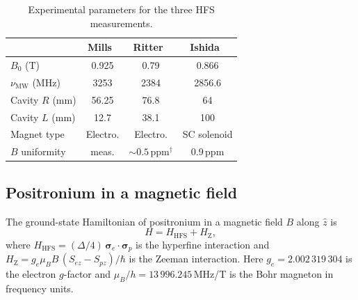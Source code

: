 \documentclass[twocolumn,pra,aps,superscriptaddress,floatfix,10pt]{revtex4-2}
\begin{document}
\begin{table}[b]
\caption{Experimental parameters for the three HFS measurements.}
\label{tab:experiments}
\begin{ruledtabular}
\begin{tabular}{lccc}
 & Mills~\cite{Mills1975} & Ritter~\cite{Ritter1984} & Ishida~\cite{Ishida2014} \\
\hline
$B_0$ (T) & 0.925 & 0.79 & 0.866 \\
$\nu_\mathrm{MW}$ (MHz) & 3253 & 2384 & 2856.6 \\
Cavity $R$ (mm) & 56.25 & 76.8 & 64 \\
Cavity $L$ (mm) & 12.7 & 38.1 & 100 \\
Magnet type & Electro. & Electro. & SC solenoid \\
$B$ uniformity & meas. & $\sim 0.5$\,ppm$^\dagger$ & 0.9\,ppm \\
\end{tabular}
\end{ruledtabular}
\end{table}

\subsection{Positronium in a magnetic field}
\label{sec:hamiltonian}

The ground-state Hamiltonian of positronium in a magnetic field $B$ along $\hat{z}$ is
\begin{equation}
  H = H_\mathrm{HFS} + H_\mathrm{Z},
  \label{eq:hamiltonian}
\end{equation}
where $H_\mathrm{HFS} = (\Delta/4)\,\bm{\sigma}_e \cdot \bm{\sigma}_p$ is the hyperfine interaction and $H_\mathrm{Z} = g_e \mu_B B \,(S_{ez} - S_{pz})/\hbar$ is the Zeeman interaction. Here $g_e = 2.002\,319\,304$ is the electron $g$-factor and $\mu_B/h = 13\,996.245$\,MHz/T is the Bohr magneton in frequency units.
\end{document}
